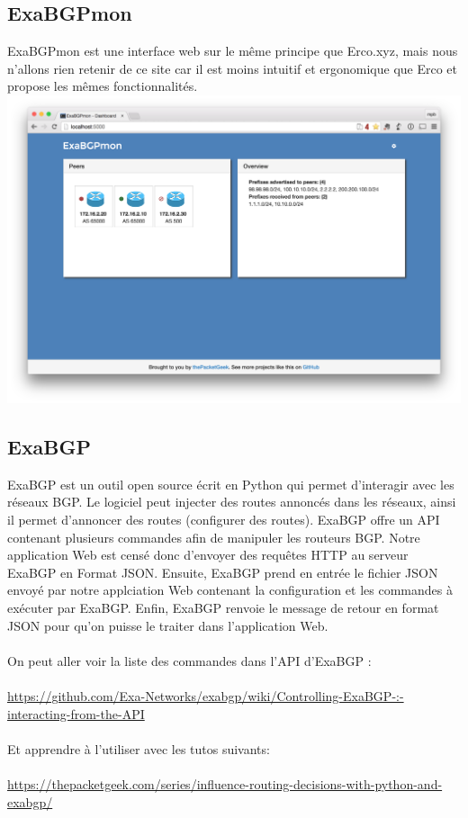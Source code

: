 \subsection{ExaBGPmon}
ExaBGPmon est une interface web sur le même principe que Erco.xyz, mais nous n'allons rien retenir de ce site car il est moins intuitif et ergonomique que Erco et propose les mêmes fonctionnalités.
\\
\includegraphics[scale = 0.40]{img/exabgpmon.png}


\subsection{ExaBGP}
ExaBGP est un outil open source écrit en Python qui permet d'interagir avec les réseaux BGP. Le logiciel peut injecter des routes annoncés dans les réseaux, ainsi il permet d'annoncer des routes (configurer des routes).
ExaBGP offre un API contenant plusieurs commandes afin de manipuler les routeurs BGP.
\newline
Notre application Web est censé donc d'envoyer des requêtes HTTP au serveur ExaBGP en Format JSON. Ensuite, ExaBGP prend en entrée le fichier JSON envoyé par notre applciation Web contenant la configuration et les commandes à exécuter par ExaBGP. 
\newline
Enfin, ExaBGP renvoie le message de retour en format JSON pour qu'on puisse le traiter dans l'application Web.
\\
\\
On peut aller voir la liste des commandes dans l'API d'ExaBGP : 
\\
\\
\url{https://github.com/Exa-Networks/exabgp/wiki/Controlling-ExaBGP-:-interacting-from-the-API}
\\
\\
Et apprendre à l'utiliser avec les tutos suivants:
\\
\\
\url{https://thepacketgeek.com/series/influence-routing-decisions-with-python-and-exabgp/}

